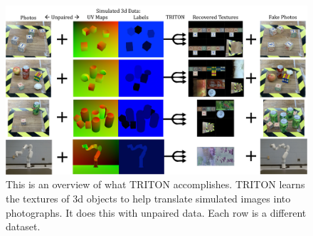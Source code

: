 \documentclass{article}
\begin{document}








\begin{figure}[H]
	\begin{center}
		\includegraphics[width=400pt]{../images/first_diagram.pdf}
	\end{center}
	\caption{
		This is an overview of what TRITON accomplishes.
		TRITON learns the textures of 3d objects to help translate simulated images into photographs. It does this with unpaired data. Each row is a different dataset.
		}
	\label{fig:first_diagram}
\end{figure}
\end{document}
